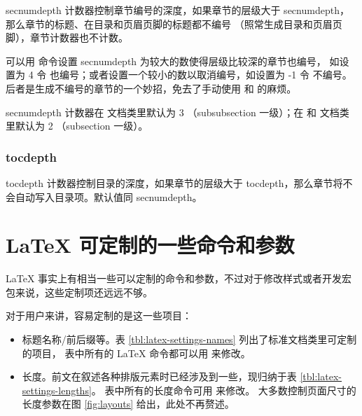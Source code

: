 secnumdepth 计数器控制章节编号的深度，如果章节的层级大于 secnumdepth，那么章节的标题、在目录和页眉页脚的标题都不编号
（照常生成目录和页眉页脚），章节计数器也不计数。

可以用  命令设置 secnumdepth 为较大的数使得层级比较深的章节也编号，
如设置为 4 令  也编号；或者设置一个较小的数以取消编号，如设置为 -1 令  不编号。
后者是生成不编号的章节的一个妙招，免去了手动使用  和  的麻烦。

secnumdepth 计数器在  文档类里默认为 3 （subsubsection 一级）；在  和  文档类里默认为 2 （subsection 一级）。

\subsubsection{tocdepth}

tocdepth 计数器控制目录的深度，如果章节的层级大于 tocdepth，那么章节将不会自动写入目录项。默认值同 secnumdepth。

\section{\LaTeX{} 可定制的一些命令和参数}\label{sec:latex-settings}

\LaTeX{} 事实上有相当一些可以定制的命令和参数，不过对于修改样式或者开发宏包来说，这些定制项还远远不够。

对于用户来讲，容易定制的是这一些项目：

\begin{itemize}
  \item 标题名称/前后缀等。表 \ref{tbl:latex-settings-names} 列出了标准文档类里可定制的项目，
  表中所有的 \LaTeX{} 命令都可以用  来修改。
  \item 长度。前文在叙述各种排版元素时已经涉及到一些，现归纳于表 \ref{tbl:latex-settings-lengths}。
  表中所有的长度命令可用  来修改。
  大多数控制页面尺寸的长度参数在图 \ref{fig:layouts} 给出，此处不再赘述。
\end{itemize}


